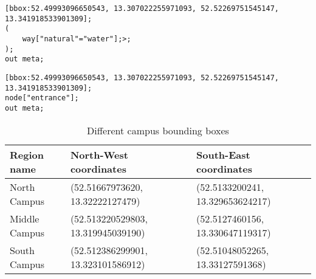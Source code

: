 \begin{lstlisting}[caption={Overpass Turbo query for water areas next to the campus}, label={water}]
[bbox:52.49993096650543, 13.307022255971093, 52.52269751545147, 13.341918533901309];
(
    way["natural"="water"];>;
);
out meta;
\end{lstlisting}

\begin{lstlisting}[caption={Overpass Turbo query for all entrances to buildings on the campus}, label={entrances}]
[bbox:52.49993096650543, 13.307022255971093, 52.52269751545147, 13.341918533901309];
node["entrance"];
out meta;
\end{lstlisting}

\begin{table}[H]
    \small
    \centering
    \begin{tabular}{|l|l|l|}
        \hline
        \textbf{Region name}     & \textbf{North-West coordinates}                  & \textbf{South-East coordinates}           \\
        \hline
        North Campus             & (52.51667973620, 13.32222127479)	              	& (52.5133200241, 13.329653624217)          \\
        \hline
        Middle Campus            & (52.513220529803, 13.319945039190)              	& (52.5127460156, 13.330647119317)          \\
        \hline
        South Campus             & (52.512386299901, 13.323101586912)              	& (52.51048052265, 13.33127591368)          \\
        \hline
    \end{tabular}
    \caption{Different campus bounding boxes}
    \label{table:campus_regions}
\end{table}
